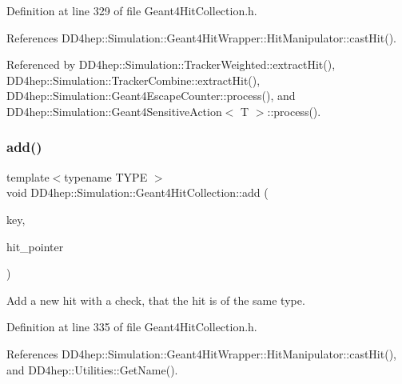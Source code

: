 Definition at line 329 of file Geant4\+Hit\+Collection.\+h.



References D\+D4hep\+::\+Simulation\+::\+Geant4\+Hit\+Wrapper\+::\+Hit\+Manipulator\+::cast\+Hit().



Referenced by D\+D4hep\+::\+Simulation\+::\+Tracker\+Weighted\+::extract\+Hit(), D\+D4hep\+::\+Simulation\+::\+Tracker\+Combine\+::extract\+Hit(), D\+D4hep\+::\+Simulation\+::\+Geant4\+Escape\+Counter\+::process(), and D\+D4hep\+::\+Simulation\+::\+Geant4\+Sensitive\+Action$<$ T $>$\+::process().

\hypertarget{class_d_d4hep_1_1_simulation_1_1_geant4_hit_collection_a7a7f4d771ab2266fe0b6869001af9e6d}{}\label{class_d_d4hep_1_1_simulation_1_1_geant4_hit_collection_a7a7f4d771ab2266fe0b6869001af9e6d} 
\subsubsection{\texorpdfstring{add()}{add()}\hspace{0.1cm}{\footnotesize\ttfamily [2/2]}}
{\footnotesize\ttfamily template$<$typename T\+Y\+PE $>$ \\
void D\+D4hep\+::\+Simulation\+::\+Geant4\+Hit\+Collection\+::add (\begin{DoxyParamCaption}\item[{Volume\+ID}]{key,  }\item[{T\+Y\+PE $\ast$}]{hit\+\_\+pointer }\end{DoxyParamCaption})\hspace{0.3cm}{\ttfamily [inline]}}



Add a new hit with a check, that the hit is of the same type. 



Definition at line 335 of file Geant4\+Hit\+Collection.\+h.



References D\+D4hep\+::\+Simulation\+::\+Geant4\+Hit\+Wrapper\+::\+Hit\+Manipulator\+::cast\+Hit(), and D\+D4hep\+::\+Utilities\+::\+Get\+Name().

\hypertarget{class_d_d4hep_1_1_simulation_1_1_geant4_hit_collection_a02e7c1123e909477f4b7951e94c10768}{}\label{class_d_d4hep_1_1_simulation_1_1_geant4_hit_collection_a02e7c1123e909477f4b7951e94c10768} 
